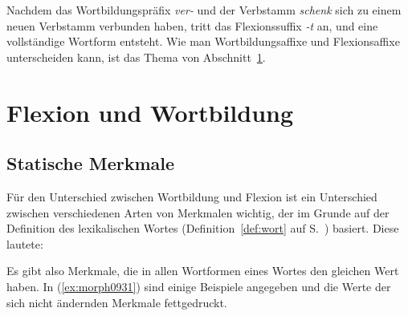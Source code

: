 Nachdem das Wortbildungspräfix \textit{ver-} und der Verbstamm \textit{schenk} sich zu einem neuen Verbstamm verbunden haben, tritt das Flexionssuffix \textit{-t} an, und eine vollständige Wortform entsteht.
Wie man Wortbildungsaffixe und Flexionsaffixe unterscheiden kann, ist das Thema von Abschnitt~\ref{sec:flexwortbild}.




\section{Flexion und Wortbildung}

\label{sec:flexwortbild}

\subsection{Statische Merkmale}

\label{sec:inhmerk}

Für den Unterschied zwischen Wortbildung und Flexion ist ein Unterschied zwischen verschiedenen Arten von Merkmalen wichtig, der im Grunde auf der Definition des lexikalischen Wortes (Definition~\ref{def:wort} auf S.~\pageref{def:wort}) basiert.
Diese lautete:

\begin{quote}
  \DefWort
\end{quote}

Es gibt also Merkmale, die in allen Wortformen eines Wortes den gleichen Wert haben.
In (\ref{ex:morph0931}) sind einige Beispiele angegeben und die Werte der sich nicht ändernden Merkmale fettgedruckt.

\begin{exe}
  \ex \label{ex:morph0931}
  \begin{xlist}
  \end{xlist}
\end{exe}

